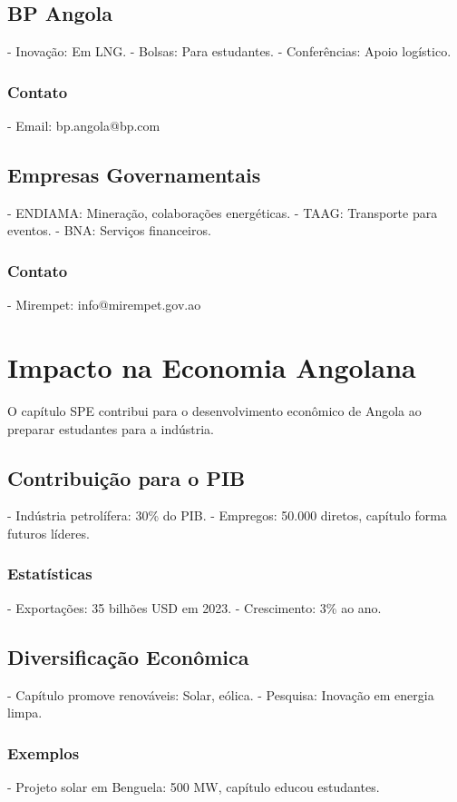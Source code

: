 \documentclass[12pt]{article}
\begin{document}
\subsection{BP Angola}
- Inovação: Em LNG.
- Bolsas: Para estudantes.
- Conferências: Apoio logístico.

\subsubsection{Contato}
- Email: bp.angola@bp.com

\subsection{Empresas Governamentais}
- ENDIAMA: Mineração, colaborações energéticas.
- TAAG: Transporte para eventos.
- BNA: Serviços financeiros.

\subsubsection{Contato}
- Mirempet: info@mirempet.gov.ao

\section{Impacto na Economia Angolana}

O capítulo SPE contribui para o desenvolvimento econômico de Angola ao preparar estudantes para a indústria.

\subsection{Contribuição para o PIB}
- Indústria petrolífera: 30\% do PIB.
- Empregos: 50.000 diretos, capítulo forma futuros líderes.

\subsubsection{Estatísticas}
- Exportações: 35 bilhões USD em 2023.
- Crescimento: 3\% ao ano.

\subsection{Diversificação Econômica}
- Capítulo promove renováveis: Solar, eólica.
- Pesquisa: Inovação em energia limpa.

\subsubsection{Exemplos}
- Projeto solar em Benguela: 500 MW, capítulo educou estudantes.
\end{document}
